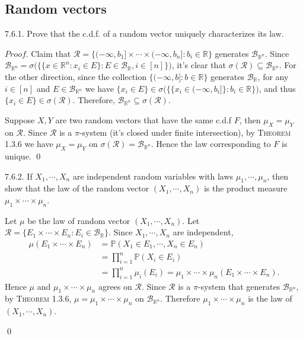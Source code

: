 \subsection{Random vectors}
\begin{exercise}7.6.1.
Prove that the c.d.f. of a random vector uniquely characterizes its law.
\end{exercise}
$Proof.$ Claim that $\mathcal{R}=\{(-\infty,b_1]\times\cdots\times(-\infty,b_n]:b_i\in\mathbb{R}\}$ generates $\mathcal{B}_{\mathbb{R}^n}$. Since $\mathcal{B}_{\mathbb{R}^n}=\sigma\big(\big\{\{x\in\mathbb{R}^n:x_i\in E\}:E\in\mathcal{B}_\mathbb{R},i\in[n]\big\}\big)$, it's clear that $\sigma(\mathcal{R})\subseteq\mathcal{B}_{\mathbb{R}^n}$. For the other direction, since the collection $\{(-\infty,b]:b\in\mathbb{R}\}$ generates $\mathcal{B}_\mathbb{R}$, for any $i\in[n]$ and $E\in\mathcal{B}_{\mathbb{R}^n}$ we have $\{x_i\in E\}\in\sigma\big(\big\{\{x_i\in(-\infty,b_i]\}:b_i\in\mathbb{R}\big\}\big)$, and thus $\{x_i\in E\}\in\sigma(\mathcal{R})$. Therefore, $\mathcal{B}_{\mathbb{R}^n}\subseteq\sigma(\mathcal{R})$.

Suppose $X,Y$ are two random vectors that have the same c.d.f $F$, then $\mu_X=\mu_Y$ on $\mathcal{R}$. Since $\mathcal{R}$ is a $\pi$-system (it's closed under finite intersection), by \textsc{Theorem 1.3.6} we have $\mu_X=\mu_Y$ on $\sigma(\mathcal{R})=\mathcal{B}_{\mathbb{R}^n}$. Hence the law corresponding to $F$ is unique. \qed \qquad

\begin{exercise}7.6.2. If $X_1,\cdots, X_n$ are independent random variables with laws $\mu_1,\cdots,\mu_n$, then show that the law of the random vector $(X_1,\cdots, X_n)$ is the product measure $\mu_1\times\cdots\times\mu_n$.
\end{exercise}
\begin{answer}
    Let $\mu$ be the law of random vector $(X_1,\cdots,X_n)$. Let $\mathcal{R}=\{E_1\times\cdots\times E_n:E_i\in\mathcal{B}_\mathbb{R}\}$. Since $X_1,\cdots,X_n$ are independent,
\begin{equation*}
\begin{aligned}
    \mu(E_1\times\cdots\times E_n)&=\mathbb{P}(X_1\in E_1,\cdots, X_n\in E_n)\\&
    =\prod_{i=1}^n\mathbb{P}(X_i\in E_i)\\&
    =\prod_{i=1}^n\mu_i(E_i)=\mu_1\times\cdots\times\mu_n(E_1\times\cdots\times E_n).
\end{aligned}
\end{equation*}
Hence $\mu$ and $\mu_1\times\cdots\times\mu_n$ agrees on $\mathcal{R}$. Since $\mathcal{R}$ is a $\pi$-system that generates $\mathcal{B}_{\mathbb{R}^n}$, by \textsc{Theorem 1.3.6}, $\mu=\mu_1\times\cdots\times\mu_n$ on $\mathcal{B}_{\mathbb{R}^n}$. Therefore $\mu_1\times\cdots\times\mu_n$ is the law of $(X_1,\cdots,X_n)$.
\end{answer}\qed \qquad

